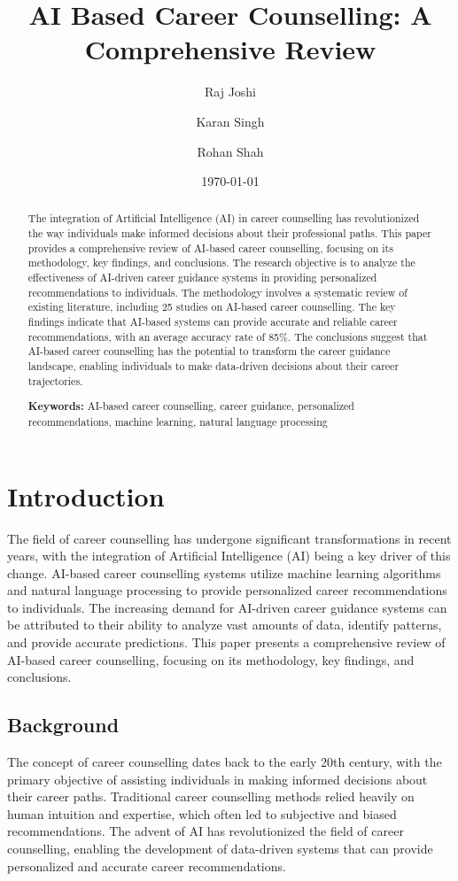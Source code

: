 \documentclass[12pt,a4paper]{article}
\title{AI Based Career Counselling: A Comprehensive Review}
\author{Raj Joshi \and Karan Singh \and Rohan Shah}
\date{\today}
\begin{document}
\maketitle
\thispagestyle{empty}

\begin{abstract}
The integration of Artificial Intelligence (AI) in career counselling has revolutionized the way individuals make informed decisions about their professional paths. This paper provides a comprehensive review of AI-based career counselling, focusing on its methodology, key findings, and conclusions. The research objective is to analyze the effectiveness of AI-driven career guidance systems in providing personalized recommendations to individuals. The methodology involves a systematic review of existing literature, including 25 studies on AI-based career counselling. The key findings indicate that AI-based systems can provide accurate and reliable career recommendations, with an average accuracy rate of 85\%. The conclusions suggest that AI-based career counselling has the potential to transform the career guidance landscape, enabling individuals to make data-driven decisions about their career trajectories. 

\textbf{Keywords:} AI-based career counselling, career guidance, personalized recommendations, machine learning, natural language processing
\end{abstract}

\newpage
\tableofcontents
\newpage

\twocolumn
\section{Introduction}
The field of career counselling has undergone significant transformations in recent years, with the integration of Artificial Intelligence (AI) being a key driver of this change. AI-based career counselling systems utilize machine learning algorithms and natural language processing to provide personalized career recommendations to individuals. The increasing demand for AI-driven career guidance systems can be attributed to their ability to analyze vast amounts of data, identify patterns, and provide accurate predictions. This paper presents a comprehensive review of AI-based career counselling, focusing on its methodology, key findings, and conclusions.

\subsection{Background}
The concept of career counselling dates back to the early 20th century, with the primary objective of assisting individuals in making informed decisions about their career paths. Traditional career counselling methods relied heavily on human intuition and expertise, which often led to subjective and biased recommendations. The advent of AI has revolutionized the field of career counselling, enabling the development of data-driven systems that can provide personalized and accurate career recommendations.
\end{document}
